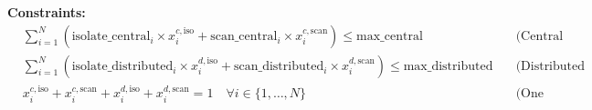 \documentclass{article}
\begin{document}
\textbf{Constraints:}
\begin{align}
    &\sum_{i=1}^{N} (\text{isolate\_central}_i \times x_{i}^{c, \text{iso}} + \text{scan\_central}_i \times x_{i}^{c, \text{scan}}) \leq \text{max\_central} \quad & \text{(Central Processing Time Constraint)} \\
    &\sum_{i=1}^{N} (\text{isolate\_distributed}_i \times x_{i}^{d, \text{iso}} + \text{scan\_distributed}_i \times x_{i}^{d, \text{scan}}) \leq \text{max\_distributed} \quad & \text{(Distributed Processing Time Constraint)} \\
    &x_{i}^{c, \text{iso}} + x_{i}^{c, \text{scan}} + x_{i}^{d, \text{iso}} + x_{i}^{d, \text{scan}} = 1 \quad \forall i \in \{1, \ldots, N\} & \text{(One Intervention per Cluster Constraint)}
\end{align}
\end{document}
